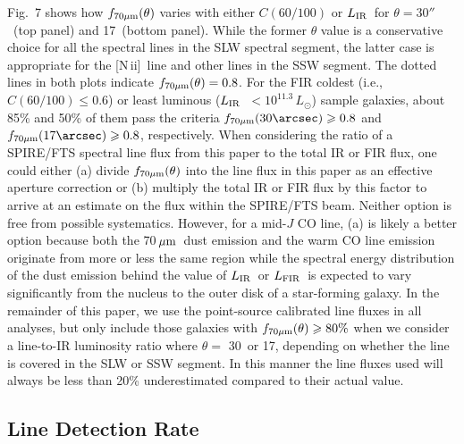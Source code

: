 \documentclass[preprint]{aastex}
\newcommand{\um}{\mbox{$\,\mu{\rm m}$}}
\newcommand{\LIR}{\mbox{$L_{\rm IR}$}}
\newcommand{\LFIR}{\mbox{$L_{\rm FIR}$}}
\newcommand{\NII}{\mbox{[N\,{\sc ii}]}}
\begin{document}
Fig.~7 shows how $f_{70\mu{\rm m}}(\theta)$ varies with either $C(60/100)$ or \LIR\
for $\theta = 30''$\ (top panel) and 17\arcsec\ (bottom panel).  While the former 
$\theta$ value is a conservative choice for all the spectral lines in the SLW spectral 
segment,  the latter case is appropriate for the \NII\ line and other lines
in the SSW segment.  The dotted lines in both plots indicate $f_{70\mu{\rm m}}(\theta)
= 0.8$. For the FIR coldest (i.e., $C(60/100) \leqslant 0.6$) or least luminous 
(\LIR\ $< 10^{11.3}\,L_{\odot}$) sample galaxies, about 85\% and 50\% of them
pass the criteria $f_{70\mu{\rm m}}(30\arcsec) \geqslant 0.8$ and $f_{70\mu{\rm m}}(17\arcsec) 
\geqslant 0.8$, respectively.   When considering the ratio of a SPIRE/FTS spectral 
line flux from this paper to the total IR or FIR flux,  one could either (a) divide 
$f_{70\mu{\rm m}}(\theta)$ into the line flux in this paper as an effective aperture
correction or (b) multiply the total IR or FIR flux by this factor to arrive at an 
estimate on the flux within the SPIRE/FTS beam. 
Neither option is free from possible systematics. However, for a mid-$J$ CO line, 
(a) is likely a better option because both the 70\um\ dust emission and the warm
CO line emission originate from more or less the same region while the spectral
energy distribution of the dust emission behind the value of \LIR\ or \LFIR\ is 
expected to vary significantly from the nucleus to the outer disk of a star-forming
galaxy.   In the remainder of this paper, we use the point-source calibrated
line fluxes in all analyses, but only include those galaxies 
with $f_{70\mu{\rm m}}(\theta) \geqslant 80\%$ when we consider a line-to-IR luminosity
ratio where $\theta =$ 30\arcsec\ or 17\arcsec, depending on whether the line is covered 
in the SLW or SSW segment. In this manner the line fluxes used will always be less 
than 20\% underestimated compared to their actual value.

 






\subsection{Line Detection Rate} \label{sec4.3}
\end{document}
